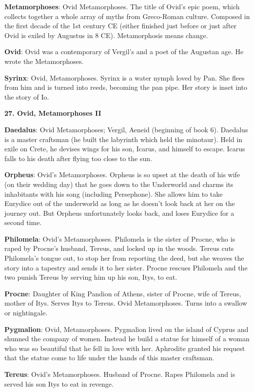 \documentclass{scrartcl}
\begin{document}
\begin{multicols*}{3}
{\bf Metamorphoses}: Ovid Metamorphoses. The title of Ovid's epic poem, which collects together a whole array of myths from Greco-Roman culture. Composed in the first decade of the 1st century CE (either finished just before or just after Ovid is exiled by Augustus in 8 CE). Metamorphosis means change.

{\bf Ovid}: Ovid was a contemporary of Vergil's and a poet of the Augustan age. He wrote the Metamorphoses.

{\bf Syrinx}: Ovid, Metamorphoses. Syrinx is a water nymph loved by Pan. She flees from him and is turned into reeds, becoming the pan pipe. Her story is inset into the story of Io.


{\bf 27. Ovid, Metamorphoses II}

{\bf Daedalus}: Ovid Metamorphoses; Vergil, Aeneid (beginning of book 6). Daedalus is a master craftsman (he built the labyrinth which held the minotaur). Held in exile on Crete, he devises wings for his son, Icarus, and himself to escape. Icarus falls to his death after flying too close to the sun.

{\bf Orpheus}: Ovid's Metamorphoses. Orpheus is so upset at the death of his wife (on their wedding day) that he goes down to the Underworld and charms its inhabitants with his song (including Persephone). She allows him to take Eurydice out of the underworld as long as he doesn't look back at her on the journey out. But Orpheus unfortunately looks back, and loses Eurydice for a second time. 

{\bf Philomela}: Ovid's Metamorphoses. Philomela is the sister of Procne, who is raped by Procne's husband, Tereus, and locked up in the woods. Tereus cuts Philomela's tongue out, to stop her from reporting the deed, but she weaves the story into a tapestry and sends it to her sister. Procne rescues Philomela and the two punish Tereus by serving him up his son, Itys, to eat.

{\bf Procne}: Daughter of King Pandion of Athens, sister of Procne, wife of Tereus, mother of Itys. Serves Itys to Tereus. Ovid Metamorphoses. Turns into a swallow or nightingale.

{\bf Pygmalion}: Ovid, Metamorphoses. Pygmalion lived on the island of Cyprus and shunned the company of women. Instead he build a statue for himself of a woman who was so beautiful that he fell in love with her. Aphrodite granted his request that the statue come to life under the hands of this master craftsman.

{\bf Tereus}: Ovid's Metamorphoses. Husband of Procne. Rapes Philomela and is served his son Itys to eat in revenge.


\end{multicols*}
\end{document}
